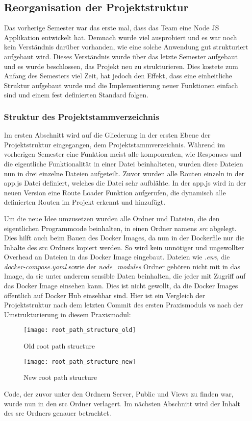 \subsection{Reorganisation der Projektstruktur}\label{subsec:subsection-two-one}

Das vorherige Semester war das erste mal, dass das Team eine Node JS Applikation entwickelt hat.
Demnach wurde viel ausprobiert und es war noch kein Verständnis darüber vorhanden, wie eine solche Anwendung gut strukturiert aufgebaut wird.
Dieses Verständnis wurde über das letzte Semester aufgebaut und es wurde beschlossen, das Projekt neu zu strukturieren.
Dies kostete zum Anfang des Semesters viel Zeit, hat jedoch den Effekt, dass eine einheitliche Struktur aufgebaut wurde und die Implementierung neuer Funktionen einfach sind und einem fest definierten Standard folgen.

\subsubsection{Struktur des Projektstammverzeichnis}
Im ersten Abschnitt wird auf die Gliederung in der ersten Ebene der Projektstruktur eingegangen, dem Projektstammverzeichnis.
Während im vorherigen Semester eine Funktion meist alle komponenten, wie Responses und die eigentliche Funktionalität in einer Datei beinhalteten, wurden diese Dateien nun in drei einzelne Dateien aufgeteilt.
Zuvor wurden alle Routen einzeln in der app.js Datei definiert, welches die Datei sehr aufblähte.
In der app.js wird in der neuen Version eine Route Loader Funktion aufgerufen, die dynamisch alle definierten Routen im Projekt erkennt und hinzufügt.

Um die neue Idee umzusetzen wurden alle Ordner und Dateien, die den eigentlichen Programmcode beinhalten, in einen Ordner namens \textit{src} abgelegt.
Dies hilft auch beim Bauen des Docker Images, da nun in der Dockerfile nur die Inhalte des src Ordners kopiert werden.
So wird kein unnötiger und ungewollter Overhead an Dateien in das Docker Image eingebaut.
Dateien wie \textit{.env}, die \textit{docker-compose.yaml} sowie der \textit{node\_modules} Ordner gehören nicht mit in das Image, da sie unter anderem sensible Daten beinhalten, die jeder mit Zugriff auf das Docker Image einsehen kann.
Dies ist nicht gewollt, da die Docker Images öffentlich auf Docker Hub einsehbar sind.
Hier ist ein Vergleich der Projektstruktur nach dem letzten Commit des ersten Praxismoduls vs nach der Umstrukturierung in diesem Praxismodul:
\begin{figure}[h]
  \centering
  \texttt{[image: root\_path\_structure\_old]}
  \caption{Old root path structure}
  \label{fig:root_path_structure_old}
\end{figure}
\begin{figure}[h]
  \centering
  \texttt{[image: root\_path\_structure\_new]}
  \caption{New root path structure}
  \label{fig:root_path_strucutr_new}
\end{figure}
Code, der zuvor unter den Ordnern Server, Public und Views zu finden war, wurde nun in den src Ordner verlagert.
Im nächsten Abschnitt wird der Inhalt des src Ordners genauer betrachtet.

